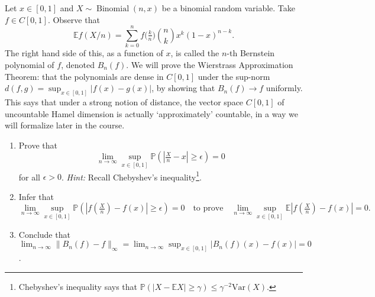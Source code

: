 \documentclass[12pt,letterpaper,cm]{hmcpset}
\begin{document}
\begin{solution}
    \vfill
\end{solution}
\clearpage


\begin{problem}[EC]
    Let $x\in[0,1]$ and $X\sim\operatorname{Binomial}(n,x)$ be a binomial
    random variable. Take $f\in C[0,1]$. Observe that
    \[
        \mathbb{E} f(X/n) = \sum_{k=0}^n f\bigl(\tfrac{k}{n}\bigr) {n\choose k} x^k (1-x)^{n-k}.
    \]
    The right hand side of this, as a function of $x$, is called the $n$-th Bernstein
    polynomial of $f$, denoted $B_n(f)$. We will prove the Wierstrass Approximation Theorem:
    that the polynomials are dense in $C[0,1]$ under the sup-norm $d(f,g) = \sup_{x\in[0,1]}
    |f(x)-g(x)|$, by showing that $B_n(f) \to f$ uniformly.
    This says that under a strong notion of distance, the vector space $C[0,1]$
    of uncountable Hamel dimension is actually `approximately' countable, in a way we will
    formalize later in the course.
    \begin{enumerate}[(1)]
        \item Prove that
            \[
                \lim_{n\to\infty}\sup_{x\in[0,1]}\mathbb{P}(|\tfrac{X}{n} - x|\geq \epsilon) = 0
            \]
            for all $\epsilon > 0$. \textit{Hint:} Recall Chebyshev's
            inequality\footnote{Chebyshev's inequality says that
            $\mathbb{P}(|X - \mathbb{E}X| \geq \gamma)\leq \gamma^{-2}\text{Var}(X)$.}.
        \item Infer that
            \[
                \lim_{n\to\infty}\sup_{x\in[0,1]} \mathbb{P}(|f(\tfrac{X}{n}) - f(x)|\geq \epsilon) = 0\quad\text{to prove}\quad
                \lim_{n\to\infty}\sup_{x\in[0,1]}\mathbb{E}|f(\tfrac{X}{n}) - f(x)| = 0.
            \]
        \item Conclude that $\lim_{n\to\infty}\|B_n(f) - f\|_\infty =
            \lim_{n\to\infty}\sup_{x\in[0,1]}|B_n(f)(x) - f(x)| = 0$.
    \end{enumerate}
\end{problem}

\begin{solution}
    \vfill
\end{solution}
\clearpage
\end{document}
